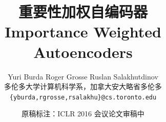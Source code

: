\title{\color{paperblue}\sffamily 重要性加权自编码器\\[0.3em]\large Importance Weighted Autoencoders}
\author{Yuri Burda \quad Roger Grosse \quad Ruslan Salakhutdinov\\
\normalsize 多伦多大学计算机科学系，加拿大安大略省多伦多\\
\small\texttt{\{yburda,rgrosse,rsalakhu\}@cs.toronto.edu}}
\date{\small 原稿标注：ICLR 2016 会议论文审稿中}
